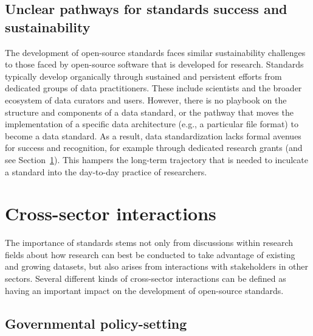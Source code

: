 \documentclass[
  number]{elsarticle}
\begin{document}
\subsection{Unclear pathways for standards success and
sustainability}\label{unclear-pathways-for-standards-success-and-sustainability}

The development of open-source standards faces similar sustainability
challenges to those faced by open-source software that is developed for
research. Standards typically develop organically through sustained and
persistent efforts from dedicated groups of data practitioners. These
include scientists and the broader ecosystem of data curators and users.
However, there is no playbook on the structure and components of a data
standard, or the pathway that moves the implementation of a specific
data architecture (e.g., a particular file format) to become a data
standard. As a result, data standardization lacks formal avenues for
success and recognition, for example through dedicated research grants
(and see Section~\ref{sec-cross-sector}). This hampers the long-term
trajectory that is needed to inculcate a standard into the day-to-day
practice of researchers.

\section{Cross-sector interactions}\label{sec-cross-sector}

The importance of standards stems not only from discussions within
research fields about how research can best be conducted to take
advantage of existing and growing datasets, but also arises from
interactions with stakeholders in other sectors. Several different kinds
of cross-sector interactions can be defined as having an important
impact on the development of open-source standards.

\subsection{Governmental
policy-setting}\label{governmental-policy-setting}
\end{document}
